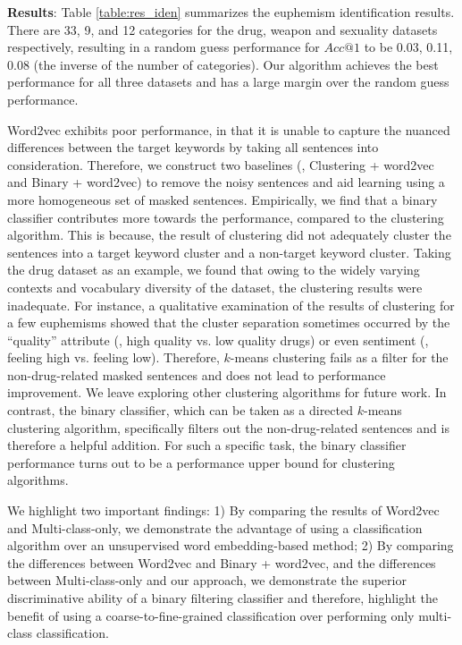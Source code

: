 \noindent \textbf{Results}: 
Table \ref{table:res_iden} summarizes the euphemism identification results. 
There are 33, 9, and 12 categories for the drug, weapon and sexuality datasets respectively, resulting in a random guess performance for $Acc@1$ to be 0.03, 0.11, 0.08 (\ie the inverse of the number of categories). 
Our algorithm achieves the best performance for all three datasets and has a large margin over the random guess performance. 


Word2vec exhibits poor performance, in that it is unable to capture the nuanced differences between the target keywords by taking all sentences into consideration. 
Therefore, we construct two baselines (\ie, Clustering + word2vec and Binary + word2vec) to remove the noisy sentences and aid learning using a more homogeneous set of masked sentences. 
Empirically, we find that a binary classifier contributes more towards the performance, compared to the clustering algorithm. 
This is because, the result of clustering %
did not adequately cluster the sentences into a target keyword cluster and a non-target keyword cluster. 
Taking the drug dataset as an example, %
we found that owing to the widely varying contexts and vocabulary diversity of the dataset,
the clustering results were inadequate. %
For instance, a qualitative examination of the results of clustering for a few euphemisms showed that the cluster separation sometimes occurred by the ``quality'' attribute (\eg, high quality vs. low quality drugs) or even sentiment (\eg, feeling high vs. feeling low). 
Therefore, $k$-means clustering fails as a filter for the non-drug-related masked sentences and does not lead to performance improvement. We leave exploring other clustering algorithms for future work.
In contrast, the binary classifier, which can be taken as a directed $k$-means clustering algorithm, specifically filters out the non-drug-related sentences and is therefore a helpful addition. 
For such a specific task, the binary classifier performance turns out to be a performance upper bound for clustering algorithms. 

We highlight two important findings: 
1) By comparing the results of Word2vec and Multi-class-only, 
we demonstrate the advantage of using a classification algorithm over an unsupervised word embedding-based method; 
2) By comparing the differences between Word2vec and Binary + word2vec, and the differences between Multi-class-only and our approach, we demonstrate the superior discriminative ability of a binary filtering classifier and therefore, highlight the benefit of using a coarse-to-fine-grained classification over performing only multi-class classification. 



